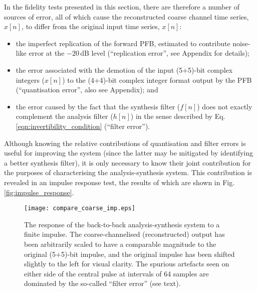 \documentclass{pasa}%
\begin{document}
In the fidelity tests presented in this section, there are therefore a number of sources of error, all of which cause the reconstructed coarse channel time series, $\hat{x}[n]$, to differ from the original input time series, $x[n]$:
\begin{itemize}
    \item the imperfect replication of the forward PFB, estimated to contribute noise-like error at the $-20\,$dB level (``replication error'', see Appendix for details);
    \item the error associated with the demotion of the input (5+5)-bit complex integers ($x[n]$) to the (4+4)-bit complex integer format output by the PFB (``quantisation error'', also see Appendix); and
    \item the error caused by the fact that the synthesis filter ($f[n]$) does not exactly complement the analysis filter ($h[n]$) in the sense described by Eq. \eqref{eqn:invertibility_condition} (``filter error'').
\end{itemize}
Although knowing the relative contributions of quantisation and filter errors is useful for improving the system (since the latter may be mitigated by identifying a better synthesis filter), it is only necessary to know their joint contribution for the purposes of characterising the analysis-synthesis system.
This contribution is revealed in an impulse response test, the results of which are shown in Fig. \eqref{fig:impulse_response}.
\begin{figure}
    \centering
    \texttt{[image: compare\_coarse\_imp.eps]}
    \caption{The response of the back-to-back analysis-synthesis system to a finite impulse. The coarse-channelised (reconstructed) output has been arbitrarily scaled to have a comparable magnitude to the original (5+5)-bit impulse, and the original impulse has been shifted slightly to the left for visual clarity. The spurious artefacts seen on either side of the central pulse at intervals of 64 samples are dominated by the so-called ``filter error'' (see text).}
    \label{fig:impulse_response}
\end{figure}
\end{document}
